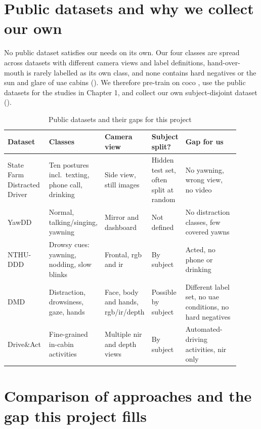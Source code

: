 \section{Public datasets and why we collect our own}


No public dataset satisfies our needs on its own. Our four classes are spread across datasets with different camera views and label definitions, hand-over-mouth is rarely labelled as its own class, and none contains hard negatives or the sun and glare of \gls{uae} cabins (). We therefore pre-train on \gls{coco} \cite{r43}, use the public datasets for the studies in Chapter 1, and collect our own subject-disjoint dataset ().

\begin{table}[htbp]
\centering
\caption{Public datasets and their gaps for this project}
\label{tab:ch2-03}
\footnotesize
\setlength{\tabcolsep}{3pt}
\renewcommand{\arraystretch}{1.15}
\begin{tabular}{|p{0.180\linewidth}|p{0.205\linewidth}|p{0.155\linewidth}|p{0.120\linewidth}|p{0.250\linewidth}|}
\hline
\textbf{Dataset} & \textbf{Classes} & \textbf{Camera view} & \textbf{Subject split?} & \textbf{Gap for us} \\
\hline
State Farm Distracted Driver \cite{r42} & Ten postures incl.\ texting, phone call, drinking & Side view, still images & Hidden test set, often split at random & No yawning, wrong view, no video \\
\hline
YawDD \cite{r36} & Normal, talking/singing, yawning & Mirror and dashboard & Not defined & No distraction classes, few covered yawns \\
\hline
NTHU-DDD \cite{r37} & Drowsy cues: yawning, nodding, slow blinks & Frontal, \gls{rgb} and \gls{ir} & By subject & Acted, no phone or drinking \\
\hline
DMD \cite{r38} & Distraction, drowsiness, gaze, hands & Face, body and hands, \gls{rgb}/\gls{ir}/depth & Possible by subject & Different label set, no \gls{uae} conditions, no hard negatives \\
\hline
Drive\&Act \cite{r39} & Fine-grained in-cabin activities & Multiple \gls{nir} and depth views & By subject & Automated-driving activities, \gls{nir} only \\
\hline
\end{tabular}
\end{table}

\section{Comparison of approaches and the gap this project fills}

